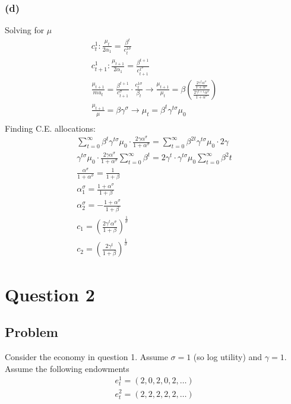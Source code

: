 \documentclass[10pt, a4paper]{article}
\begin{document}
    \subsubsection*{(d)}
      Solving for $\mu$
      \begin{gather*}
        c_t^1: \frac{\mu_t}{2\alpha_1} = \frac{\beta^t}{c_t^{1\sigma}} \\
        c_{t+1}^1: \frac{\mu_{t+1}}{2\alpha_1} = \frac{\beta^{t+1}}{c_{t+1}^{1^{\sigma}}} \\
        \frac{\mu_{t+1}}{mu_t} = \frac{\beta^{t+1}}{c_{t+1}^{\sigma}}\cdot\frac{c_t^{1\sigma}}{\beta_t} \rightarrow \frac{\mu_{t+1}}{\mu_t} = \beta(\frac{\frac{2\gamma^t\alpha^{\sigma}}{1+\alpha^{\sigma}}}{\frac{2\gamma^{t+1}\alpha^{\sigma}}{1+\alpha^{\sigma}}}) \\
        \frac{\mu_{t+1}}{\mu} = \beta\gamma^{\sigma} \rightarrow \mu_t = \beta^t\gamma^{t\sigma}\mu_0 \\
      \end{gather*}
      Finding C.E. allocations:
      \begin{gather*}
        \sum\limits_{t=0}^{\infty}\beta^t\gamma^{t\sigma}\mu_0\cdot\frac{2\gamma\alpha^{\sigma}}{1+\alpha^{\sigma}} = \sum\limits_{t=0}^{\infty}\beta^{2t}\gamma^{t\sigma}\mu_0\cdot2\gamma \\
        \gamma^{t\sigma}\mu_0\cdot\frac{2\gamma\alpha^{\sigma}}{1+\alpha^{\sigma}}\sum\limits_{t=0}^{\infty}\beta^t = 2\gamma^t\cdot\gamma^{t\sigma}\mu_0\sum\limits_{t=0}^{\infty}\beta^2t \\
        \frac{\alpha^{\sigma}}{1+\alpha^{\sigma}}  = \frac{1}{1+\beta} \\
        \alpha_1^{\sigma} = \frac{1+\alpha^{\sigma}}{1+\beta} \\
        \alpha_2^{\sigma} = -\frac{1+\alpha^{\sigma}}{1+\beta} \\
        c_1 = (\frac{2\gamma^t\alpha^\sigma}{1+\beta})^{\frac{1}{\sigma}} \\
        c_2 = (\frac{2\gamma^t}{1+\beta})^{\frac{1}{\sigma}}
      \end{gather*}
      
\section*{Question 2}
  \subsection*{Problem}
    Consider the economy in question 1. Assume $\sigma = 1$ (so log utility) and $\gamma = 1$. Assume the following endowments
    \begin{gather*}
      e^1_t = (2,0,2,0,2,\ldots)\\
      e^2_t = (2,2,2,2,2,\ldots)
    \end{gather*}
\end{document}
